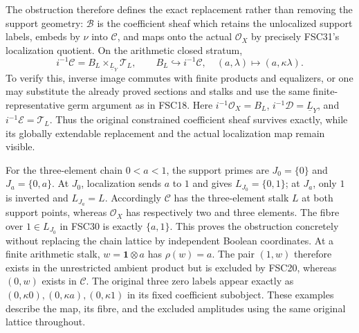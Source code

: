 The obstruction therefore defines the exact replacement rather than
removing the support geometry: $\mathcal B$ is the coefficient sheaf
which retains the unlocalized support labels, embeds by $\nu$ into
$\mathcal C$, and maps onto the actual $\mathcal O_X$ by precisely
FSC31's localization quotient. On the arithmetic closed stratum,
\begin{equation}\tag{FSC32}
 i^{-1}\mathcal C=B_L\mathbin{\times}_{\underline L_Y}\mathcal T_L,
 \qquad B_L\hookrightarrow i^{-1}\mathcal C,
 \quad (a,\lambda)\longmapsto(a,\kappa\lambda).
\end{equation}
To verify this, inverse image commutes with finite products and
equalizers, or one may substitute the already proved sections and
stalks and use the same finite-representative germ argument as in
FSC18. Here $i^{-1}\mathcal O_X=B_L$, $i^{-1}\mathcal D=\underline L_Y$,
and $i^{-1}\mathcal E=\mathcal T_L$. Thus the original constrained
coefficient sheaf survives exactly, while its globally extendable
replacement and the actual localization map remain visible.

For the three-element chain $0<a<1$, the support primes are
$J_0=\{0\}$ and $J_a=\{0,a\}$. At $J_0$, localization sends $a$ to
$1$ and gives $L_{J_0}=\{0,1\}$; at $J_a$, only $1$ is inverted and
$L_{J_a}=L$. Accordingly $\mathcal C$ has the three-element stalk
$L$ at both support points, whereas $\mathcal O_X$ has respectively
two and three elements. The fibre over $1\in L_{J_0}$ in FSC30 is
exactly $\{a,1\}$. This proves the obstruction concretely without
replacing the chain lattice by independent Boolean coordinates.
At a finite arithmetic stalk, $w=\mathbf1\otimes a$ has
$\rho(w)=a$. The pair $(1,w)$ therefore exists in the unrestricted
ambient product but is excluded by FSC20, whereas $(0,w)$ exists in
$\mathcal C$. The original three zero labels appear exactly as
$(0,\kappa0),(0,\kappa a),(0,\kappa1)$ in its fixed coefficient
subobject. These examples describe the map, its fibre, and the
excluded amplitudes using the same original lattice throughout.
